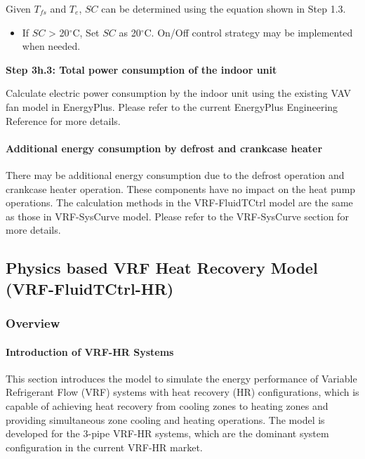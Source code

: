 Given \(T_{fs}\) and \(T_e\), \(SC\) can be determined using the equation shown in Step 1.3.

\begin{itemize}
\tightlist
\item
  If \(SC\) \textgreater{} 20\(^{\circ}\)C, Set \(SC\) as 20\(^{\circ}\)C. On/Off control strategy may be implemented when needed.
\end{itemize}

\textbf{Step 3h.3: Total power consumption of the indoor unit} 

Calculate electric power consumption by the indoor unit using the existing VAV fan model in EnergyPlus. Please refer to the current EnergyPlus Engineering Reference for more details.

\paragraph{Additional energy consumption by defrost and crankcase heater}\label{additional-energy-consumption-by-defrost-and-crankcase-heater}

There may be additional energy consumption due to the defrost operation and crankcase heater operation. These components have no impact on the heat pump operations. The calculation methods in the VRF-FluidTCtrl model are the same as those in VRF-SysCurve model. Please refer to the VRF-SysCurve section for more details.

\subsection{Physics based VRF Heat Recovery Model (VRF-FluidTCtrl-HR)}\label{VRF-FluidTCtrl-HR}

\subsubsection{Overview}\label{VRF-FluidTCtrl-HR-overview}

\paragraph{Introduction of VRF-HR Systems}\label{Introduction-of-VRF-HR-Systems}

This section introduces the model to simulate the energy performance of Variable Refrigerant Flow (VRF) systems with heat recovery (HR) configurations, which is capable of achieving heat recovery from cooling zones to heating zones and providing simultaneous zone cooling and heating operations. The model is developed for the 3-pipe VRF-HR systems, which are the dominant system configuration in the current VRF-HR market. 

